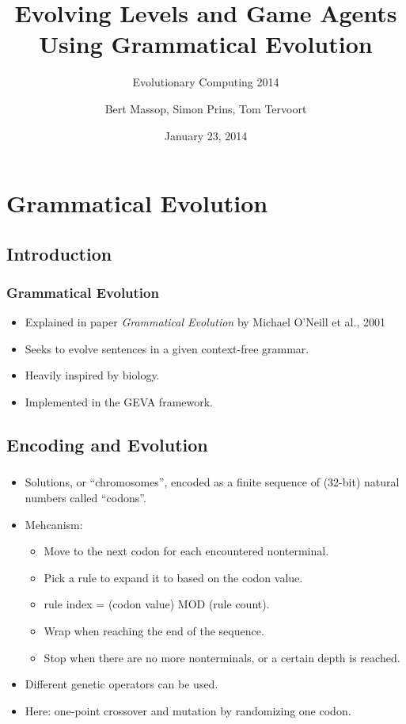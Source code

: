 \documentclass{beamer}
\title{Evolving Levels and Game Agents Using Grammatical Evolution}
\subtitle{Evolutionary Computing 2014}
\author{Bert Massop, Simon Prins, Tom Tervoort}
\date{January 23, 2014}
\makeatletter
\newcommand*{\currentname}{\@currentlabelname}
\makeatother
\begin{document}
\begin{frame}
\titlepage
\end{frame}

\section{Grammatical Evolution}
\subsection{Introduction}
\begin{frame}
\frametitle{Grammatical Evolution}
\begin{itemize}
\item Explained in paper \textit{Grammatical Evolution} by Michael O'Neill et al., 2001 \cite{o2001grammatical}
\item Seeks to evolve sentences in a given context-free grammar.
\item Heavily inspired by biology.
\item Implemented in the GEVA framework.
\end{itemize}
\end{frame}

\subsection{Encoding and Evolution}
\begin{frame}
\frametitle{\currentname}
\begin{itemize}
\item Solutions, or ``chromosomes'', encoded as a finite sequence of (32-bit) natural numbers called ``codons''.
\item Mehcanism:
\begin{itemize}
	\item Move to the next codon for each encountered nonterminal.
	\item Pick a rule to expand it to based on the codon value.
	\item rule index = (codon value) MOD (rule count).
	\item Wrap when reaching the end of the sequence.
	\item Stop when there are no more nonterminals, or a certain depth is reached.
\end{itemize}
\end{itemize}
\begin{itemize}
	\item Different genetic operators can be used.
	\item Here: one-point crossover and mutation by randomizing one codon.
\end{itemize}

\end{frame}
\end{document}
